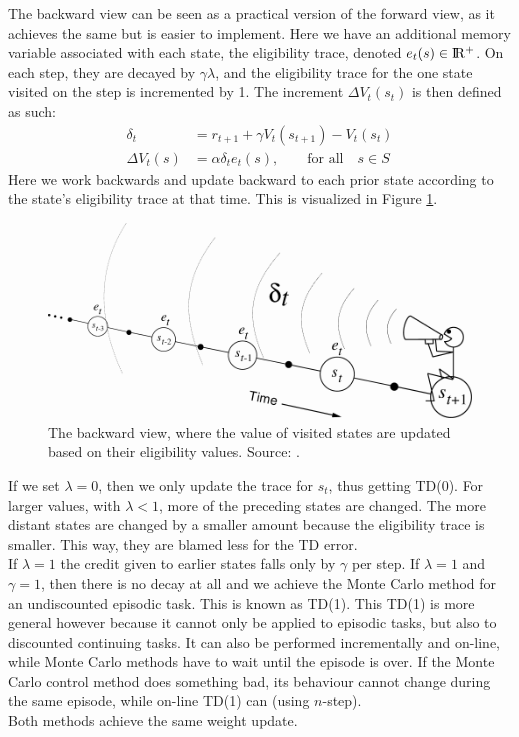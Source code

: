 \documentclass[a4paper, 11pt]{article}
\begin{document}
The backward view can be seen as a practical version of the forward view, as it achieves the same but is easier to implement.
Here we have an additional memory variable associated with each state, the eligibility trace, denoted $e_t(s) \in \rm I\!R^+$. On each step, they are decayed by $\gamma \lambda$, and the eligibility trace for the one state visited on the step is incremented by 1. The increment $\Delta V_t(s_t)$ is then defined as such:
\begin{subequations}
\label{eq:backview}
\begin{align}
\delta_t &= r_{t+1} + \gamma V_t(s_{t+1}) - V_t(s_t) \label{eq:backview1} \\
\Delta V_t(s) &= \alpha \delta_t e_t(s), \qquad \text{for all} \quad s \in S \label{eq:backview2}
\end{align}
\end{subequations}
Here we work backwards and update backward to each prior state according to the state's eligibility trace at that time. This is visualized in Figure \ref{fig:TDBackwardView}.
\begin{figure}[htb]
\includegraphics[width=\linewidth]{images/TDBackwardView.png}
\caption[TD backward view]{The backward view, where the value of visited states are updated based on their eligibility values. Source: \cite{Sutton1998ReinforcementIntroduction}.}
\label{fig:TDBackwardView}
\end{figure}
If we set $\lambda = 0$, then we only update the trace for $s_t$, thus getting TD(0). For larger values, with $\lambda < 1$, more of the preceding states are changed. The more distant states are changed by a smaller amount because the eligibility trace is smaller. This way, they are blamed less for the TD error.\\
If $\lambda = 1$ the credit given to earlier states falls only by $\gamma$ per step. If $\lambda = 1$ and $\gamma = 1$, then there is no decay at all and we achieve the Monte Carlo method for an undiscounted episodic task. This is known as TD(1). This TD(1) is more general however because it cannot only be applied to episodic tasks, but also to discounted continuing tasks. It can also be performed incrementally and on-line, while Monte Carlo methods have to wait until the episode is over. If the Monte Carlo control method does something bad, its behaviour cannot change during the same episode, while on-line TD(1) can (using $n$-step).\\
Both methods achieve the same weight update.\\
\end{document}

